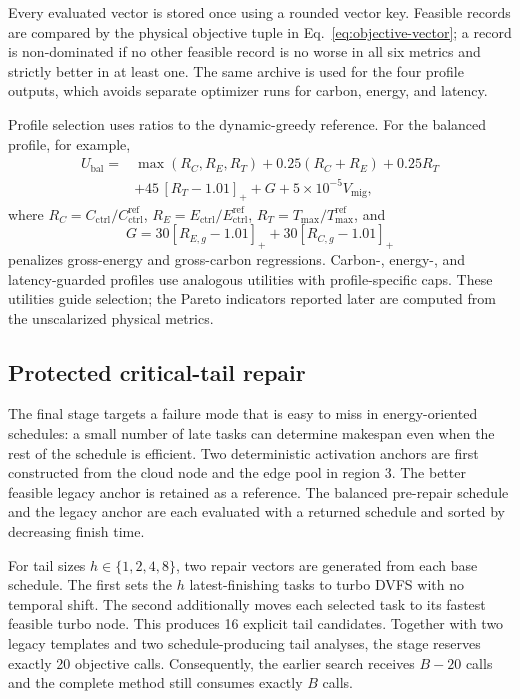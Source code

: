 \documentclass[preprint,12pt]{elsarticle}
\begin{document}
Every evaluated vector is stored once using a rounded vector key. Feasible records are compared by the physical objective tuple in Eq.~\eqref{eq:objective-vector}; a record is non-dominated if no other feasible record is no worse in all six metrics and strictly better in at least one. The same archive is used for the four profile outputs, which avoids separate optimizer runs for carbon, energy, and latency.

Profile selection uses ratios to the dynamic-greedy reference. For the balanced profile, for example,
\begin{align}
U_{\mathrm{bal}} ={}& \max(R_C,R_E,R_T)+0.25(R_C+R_E)+0.25R_T \\
&+45\,[R_T-1.01]_+ + G + 5\times10^{-5}V_{\mathrm{mig}},
\label{eq:balanced-utility}
\end{align}
where $R_C=C_{\mathrm{ctrl}}/C_{\mathrm{ctrl}}^{\mathrm{ref}}$, $R_E=E_{\mathrm{ctrl}}/E_{\mathrm{ctrl}}^{\mathrm{ref}}$, $R_T=T_{\max}/T_{\max}^{\mathrm{ref}}$, and
\begin{equation}
G=30[R_{E,g}-1.01]_+ +30[R_{C,g}-1.01]_+
\end{equation}
penalizes gross-energy and gross-carbon regressions. Carbon-, energy-, and latency-guarded profiles use analogous utilities with profile-specific caps. These utilities guide selection; the Pareto indicators reported later are computed from the unscalarized physical metrics.

\subsection{Protected critical-tail repair}
\label{sec:tail-repair}

The final stage targets a failure mode that is easy to miss in energy-oriented schedules: a small number of late tasks can determine makespan even when the rest of the schedule is efficient. Two deterministic activation anchors are first constructed from the cloud node and the edge pool in region 3. The better feasible legacy anchor is retained as a reference. The balanced pre-repair schedule and the legacy anchor are each evaluated with a returned schedule and sorted by decreasing finish time.

For tail sizes $h\in\{1,2,4,8\}$, two repair vectors are generated from each base schedule. The first sets the $h$ latest-finishing tasks to turbo DVFS with no temporal shift. The second additionally moves each selected task to its fastest feasible turbo node. This produces 16 explicit tail candidates. Together with two legacy templates and two schedule-producing tail analyses, the stage reserves exactly 20 objective calls. Consequently, the earlier search receives $B-20$ calls and the complete method still consumes exactly $B$ calls.
\end{document}
